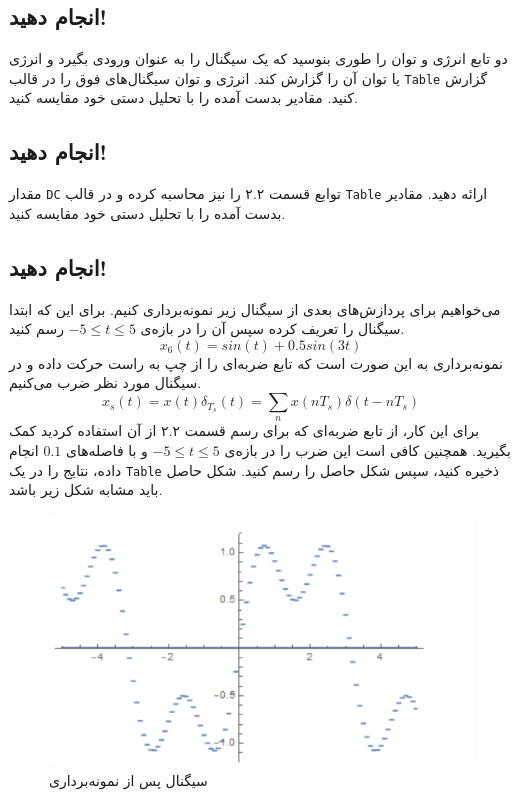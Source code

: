 \documentclass{utsignal}
\begin{document}
	\subsection{انجام دهید!}
	دو تابع انرژی و توان را طوری بنوسید که یک سیگنال را به عنوان ورودی بگیرد و انرژی یا توان آن را گزارش کند. انرژی و توان سیگنال‌های فوق را در قالب \lstinline{Table} گزارش کنید. مقادیر بدست آمده را با تحلیل دستی خود مقایسه کنید.
	\subsection{انجام دهید!}
	مقدار \lstinline{DC} توابع قسمت ۲.۲ را نیز محاسبه کرده و در قالب \lstinline{Table}  ارائه دهید. مقادیر بدست آمده را با تحلیل دستی خود مقایسه کنید.
	\subsection{انجام دهید!}
	می‌خواهیم برای پردازش‌های بعدی از سیگنال زیر نمونه‌برداری کنیم. برای این که ابتدا سیگنال را تعریف کرده سپس آن را در بازه‌ی $-5 \le t \le 5$ رسم کنید.
	$$x_6(t) = sin(t) + 0.5 sin(3t)$$
	نمونه‌برداری به این صورت است که تابع ضربه‌ای را از چپ به راست حرکت داده و در سیگنال مورد نظر ضرب می‌کنیم.
	$$x_s(t) = x(t)\delta_{T_s}(t) = \sum_{n} x(nT_s)\delta(t-nT_s)$$
	برای این کار، از تابع ضربه‌ای که برای رسم قسمت ۲.۲ از آن استفاده کردید کمک بگیرید. همچنین کافی است این ضرب را در بازه‌ی $-5 \le t \le 5$ و با فاصله‌های $0.1$ انجام داده، نتایج را در یک \lstinline{Table} ذخیره کنید، سپس شکل حاصل را رسم کنید. شکل حاصل باید مشابه شکل زیر باشد.
	\begin{figure}[h]
		\centering
		\includegraphics[height=0.3\textheight,keepaspectratio]{sample.png}
		\caption{سیگنال پس از نمونه‌برداری}
	\end{figure}
	
\end{document}
